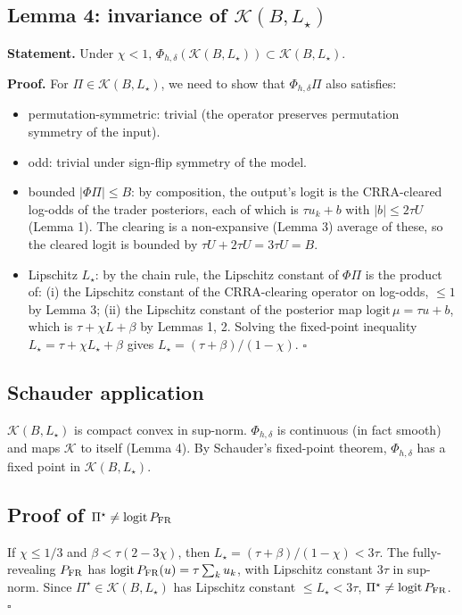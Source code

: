 \documentclass[11pt]{article}
\newcommand{\1}{\mathbf{1}}
\newcommand{\PFR}{P_{\rm FR}}
\begin{document}
\subsection{Lemma 4: invariance of $\mathcal{K}(B, L_\star)$}

\textbf{Statement.} Under $\chi < 1$, $\Phi_{h, \delta}(\mathcal{K}(B, L_\star)) \subset \mathcal{K}(B, L_\star)$.

\textbf{Proof.}
For $\Pi \in \mathcal{K}(B, L_\star)$, we need to show that
$\Phi_{h, \delta}\Pi$ also satisfies:
\begin{itemize}
\item permutation-symmetric: trivial (the operator preserves
permutation symmetry of the input).
\item odd: trivial under sign-flip symmetry of the model.
\item bounded $|\Phi \Pi| \le B$: by composition, the output's logit
is the CRRA-cleared log-odds of the trader posteriors, each of which is
$\tau u_k + b$ with $|b| \le 2 \tau U$ (Lemma 1).  The clearing is a
non-expansive (Lemma 3) average of these, so the cleared logit is bounded
by $\tau U + 2 \tau U = 3 \tau U = B$.
\item Lipschitz $L_\star$: by the chain rule, the Lipschitz constant of
$\Phi \Pi$ is the product of:
(i) the Lipschitz constant of the CRRA-clearing operator on log-odds,
$\le 1$ by Lemma 3;
(ii) the Lipschitz constant of the posterior map $\mathrm{logit}\,\mu = \tau u + b$,
which is $\tau + \chi L + \beta$ by Lemmas 1, 2.  Solving the fixed-point
inequality $L_\star = \tau + \chi L_\star + \beta$ gives $L_\star = (\tau + \beta)/(1 - \chi)$. $\square$
\end{itemize}

\subsection{Schauder application}

$\mathcal{K}(B, L_\star)$ is compact convex in sup-norm.  $\Phi_{h, \delta}$
is continuous (in fact smooth) and maps $\mathcal{K}$ to itself (Lemma 4).
By Schauder's fixed-point theorem, $\Phi_{h, \delta}$ has a fixed point
in $\mathcal{K}(B, L_\star)$.

\subsection{Proof of $\Pi^\star \ne \mathrm{logit}\,\PFR$}

If $\chi \le 1/3$ and $\beta < \tau(2 - 3\chi)$, then
$L_\star = (\tau + \beta)/(1 - \chi) < 3 \tau$.  The fully-revealing $\PFR$
has $\mathrm{logit}\,\PFR(u) = \tau \sum_k u_k$, with Lipschitz constant
$3\tau$ in sup-norm.  Since $\Pi^\star \in \mathcal{K}(B, L_\star)$ has
Lipschitz constant $\le L_\star < 3\tau$, $\Pi^\star \ne \mathrm{logit}\,\PFR$. $\square$
\end{document}
